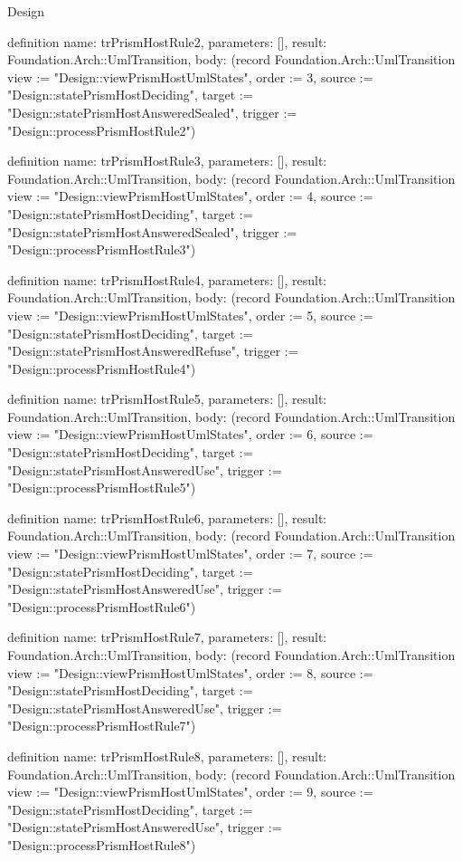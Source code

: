 \begin{lexlean}{Design}
\begin{semanticmodule}
definition{
  name: trPrismHostRule2,
  parameters: [],
  result: Foundation.Arch::UmlTransition,
  body: (record Foundation.Arch::UmlTransition {view := "Design::viewPrismHostUmlStates", order := 3, source := "Design::statePrismHostDeciding", target := "Design::statePrismHostAnsweredSealed", trigger := "Design::processPrismHostRule2"})
}

definition{
  name: trPrismHostRule3,
  parameters: [],
  result: Foundation.Arch::UmlTransition,
  body: (record Foundation.Arch::UmlTransition {view := "Design::viewPrismHostUmlStates", order := 4, source := "Design::statePrismHostDeciding", target := "Design::statePrismHostAnsweredSealed", trigger := "Design::processPrismHostRule3"})
}

definition{
  name: trPrismHostRule4,
  parameters: [],
  result: Foundation.Arch::UmlTransition,
  body: (record Foundation.Arch::UmlTransition {view := "Design::viewPrismHostUmlStates", order := 5, source := "Design::statePrismHostDeciding", target := "Design::statePrismHostAnsweredRefuse", trigger := "Design::processPrismHostRule4"})
}

definition{
  name: trPrismHostRule5,
  parameters: [],
  result: Foundation.Arch::UmlTransition,
  body: (record Foundation.Arch::UmlTransition {view := "Design::viewPrismHostUmlStates", order := 6, source := "Design::statePrismHostDeciding", target := "Design::statePrismHostAnsweredUse", trigger := "Design::processPrismHostRule5"})
}

definition{
  name: trPrismHostRule6,
  parameters: [],
  result: Foundation.Arch::UmlTransition,
  body: (record Foundation.Arch::UmlTransition {view := "Design::viewPrismHostUmlStates", order := 7, source := "Design::statePrismHostDeciding", target := "Design::statePrismHostAnsweredUse", trigger := "Design::processPrismHostRule6"})
}

definition{
  name: trPrismHostRule7,
  parameters: [],
  result: Foundation.Arch::UmlTransition,
  body: (record Foundation.Arch::UmlTransition {view := "Design::viewPrismHostUmlStates", order := 8, source := "Design::statePrismHostDeciding", target := "Design::statePrismHostAnsweredUse", trigger := "Design::processPrismHostRule7"})
}

definition{
  name: trPrismHostRule8,
  parameters: [],
  result: Foundation.Arch::UmlTransition,
  body: (record Foundation.Arch::UmlTransition {view := "Design::viewPrismHostUmlStates", order := 9, source := "Design::statePrismHostDeciding", target := "Design::statePrismHostAnsweredUse", trigger := "Design::processPrismHostRule8"})
}


\end{semanticmodule}
\end{lexlean}
